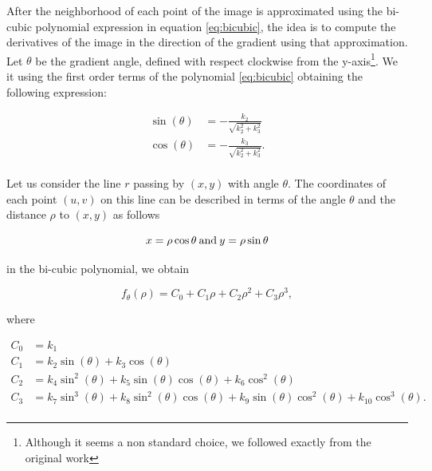 \documentclass{ipol}
\numberwithin{equation}{section}
\numberwithin{table}{section}
\begin{document}
{\myn{\label{second_derivative:haralick:analitical:statement}} After the neighborhood of each point of the image is approximated using the bi-cubic polynomial expression in equation \ref{eq:bicubic}, the idea is to compute the derivatives of the image in the direction of the gradient using that approximation.\\

Let $\theta$ be the gradient angle, defined with respect clockwise from the y-axis\footnote{Although it seems a non standard choice, we followed exactly from the original work}. We  it using the first order terms of the polynomial \ref{eq:bicubic} obtaining the following expression:

\begin{align}
\label{eq:sincos}
	\sin(\theta) & = -\frac{k_2}{\sqrt{k_2^2 + k_3^2}} \nonumber \\
	\cos(\theta) & = -\frac{k_3}{\sqrt{k_2^2 + k_3^2}}. \\
\end{align}

\myn{\label{second_derivative:haralick:analitical:derivative}} Let us consider the line $r$ passing by $(x,y)$ with angle $\theta$. The coordinates of each point $(u,v)$ on this line can be described in terms of  the angle $\theta$ and the distance $\rho$ to $(x,y)$ as follows

\begin{equation*}
	x = \rho\cos{\theta} \: \text{and} \: y = \rho\sin{\theta} \\
\end{equation*}

in the bi-cubic polynomial, we obtain

\begin{equation}
	f_{\theta}(\rho) = C_0 + C_1\rho + C_2\rho^2 + C_3\rho^3 ,
\end{equation}

where

\begin{align}
\label{eq:c}
	C_0 & = k_1 \nonumber \nonumber \\
	C_1 & = k_2\sin(\theta) + k_3\cos(\theta) \nonumber \\
	C_2 & = k_4\sin^2(\theta) + k_5\sin(\theta)\cos(\theta) + k_6\cos^2(\theta) \nonumber \\
	C_3 & = k_7\sin^3(\theta) + k_8\sin^2(\theta)\cos(\theta) + k_9\sin(\theta)\cos^2(\theta) + k_{10}\cos^3(\theta). \nonumber \\
\end{align}

}
\end{document}
